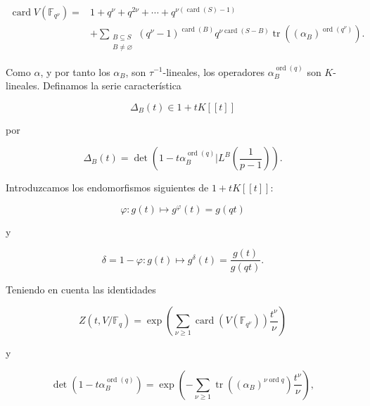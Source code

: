 \begin{equation}\tag{4.5.27}
\begin{aligned}
\operatorname{card}V(\mathbb F_{q^\nu})
={}&1+q^\nu+q^{2\nu}+\cdots
+q^{\nu(\operatorname{card}(S)-1)}\\
&+\sum_{\substack{B\subseteq S\\B\ne\varnothing}}
(q^\nu-1)^{\operatorname{card}(B)}
q^{\nu\operatorname{card}(S-B)}
\operatorname{tr}\!\left((\alpha_B)^{\operatorname{ord}(q^\nu)}\right).
\end{aligned}
\end{equation}

Como $\alpha$, y por tanto los $\alpha_B$, son $\tau^{-1}$-lineales, los
operadores $\alpha_B^{\operatorname{ord}(q)}$ son $K$-lineales. Definamos
la serie característica

\[
\Delta_B(t)\in1+tK[[t]]
\]

por

\begin{equation}\tag{4.5.28}
\Delta_B(t)=\det\!\left(
1-t\alpha_B^{\operatorname{ord}(q)}
\mathrel{\Big|}L^B\!\left(\frac1{p-1}\right)\right).
\end{equation}

Introduzcamos los endomorfismos siguientes de $1+tK[[t]]$:

\begin{equation}\tag{4.5.29}
\varphi:g(t)\longmapsto g^\varphi(t)=g(qt)
\end{equation}

y

\begin{equation}\tag{4.5.30}
\delta=1-\varphi:g(t)\longmapsto
g^\delta(t)=\frac{g(t)}{g(qt)}.
\end{equation}

\pageoriginale

Teniendo en cuenta las identidades

\begin{equation}\tag{4.5.31}
Z(t,V/\mathbb F_q)
=\exp\!\left(
\sum_{\nu\geq1}
\operatorname{card}(V(\mathbb F_{q^\nu}))\frac{t^\nu}{\nu}
\right)
\end{equation}

y

\begin{equation}\tag{4.5.32}
\det\!\left(1-t\alpha_B^{\operatorname{ord}(q)}\right)
=\exp\!\left(
-\sum_{\nu\geq1}
\operatorname{tr}\!\left((\alpha_B)^{\nu\operatorname{ord}q}\right)
\frac{t^\nu}{\nu}
\right),
\end{equation}

